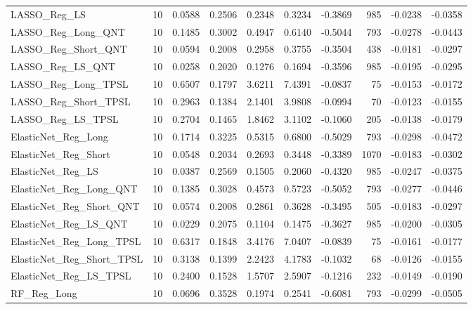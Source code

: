 \begin{tabular}{llrrrrrrrr}
\cline{1-10}
LASSO\_Reg\_LS & 10 & 0.0588 & 0.2506 & 0.2348 & 0.3234 & -0.3869 & 985 & -0.0238 & -0.0358 \\
\cline{1-10}
LASSO\_Reg\_Long\_QNT & 10 & 0.1485 & 0.3002 & 0.4947 & 0.6140 & -0.5044 & 793 & -0.0278 & -0.0443 \\
\cline{1-10}
LASSO\_Reg\_Short\_QNT & 10 & 0.0594 & 0.2008 & 0.2958 & 0.3755 & -0.3504 & 438 & -0.0181 & -0.0297 \\
\cline{1-10}
LASSO\_Reg\_LS\_QNT & 10 & 0.0258 & 0.2020 & 0.1276 & 0.1694 & -0.3596 & 985 & -0.0195 & -0.0295 \\
\cline{1-10}
LASSO\_Reg\_Long\_TPSL & 10 & 0.6507 & 0.1797 & 3.6211 & 7.4391 & -0.0837 & 75 & -0.0153 & -0.0172 \\
\cline{1-10}
LASSO\_Reg\_Short\_TPSL & 10 & 0.2963 & 0.1384 & 2.1401 & 3.9808 & -0.0994 & 70 & -0.0123 & -0.0155 \\
\cline{1-10}
LASSO\_Reg\_LS\_TPSL & 10 & 0.2704 & 0.1465 & 1.8462 & 3.1102 & -0.1060 & 205 & -0.0138 & -0.0179 \\
\cline{1-10}
ElasticNet\_Reg\_Long & 10 & 0.1714 & 0.3225 & 0.5315 & 0.6800 & -0.5029 & 793 & -0.0298 & -0.0472 \\
\cline{1-10}
ElasticNet\_Reg\_Short & 10 & 0.0548 & 0.2034 & 0.2693 & 0.3448 & -0.3389 & 1070 & -0.0183 & -0.0302 \\
\cline{1-10}
ElasticNet\_Reg\_LS & 10 & 0.0387 & 0.2569 & 0.1505 & 0.2060 & -0.4320 & 985 & -0.0247 & -0.0375 \\
\cline{1-10}
ElasticNet\_Reg\_Long\_QNT & 10 & 0.1385 & 0.3028 & 0.4573 & 0.5723 & -0.5052 & 793 & -0.0277 & -0.0446 \\
\cline{1-10}
ElasticNet\_Reg\_Short\_QNT & 10 & 0.0574 & 0.2008 & 0.2861 & 0.3628 & -0.3495 & 505 & -0.0183 & -0.0297 \\
\cline{1-10}
ElasticNet\_Reg\_LS\_QNT & 10 & 0.0229 & 0.2075 & 0.1104 & 0.1475 & -0.3627 & 985 & -0.0200 & -0.0305 \\
\cline{1-10}
ElasticNet\_Reg\_Long\_TPSL & 10 & 0.6317 & 0.1848 & 3.4176 & 7.0407 & -0.0839 & 75 & -0.0161 & -0.0177 \\
\cline{1-10}
ElasticNet\_Reg\_Short\_TPSL & 10 & 0.3138 & 0.1399 & 2.2423 & 4.1783 & -0.1032 & 68 & -0.0126 & -0.0155 \\
\cline{1-10}
ElasticNet\_Reg\_LS\_TPSL & 10 & 0.2400 & 0.1528 & 1.5707 & 2.5907 & -0.1216 & 232 & -0.0149 & -0.0190 \\
\cline{1-10}
RF\_Reg\_Long & 10 & 0.0696 & 0.3528 & 0.1974 & 0.2541 & -0.6081 & 793 & -0.0299 & -0.0505 \\

\end{tabular}
